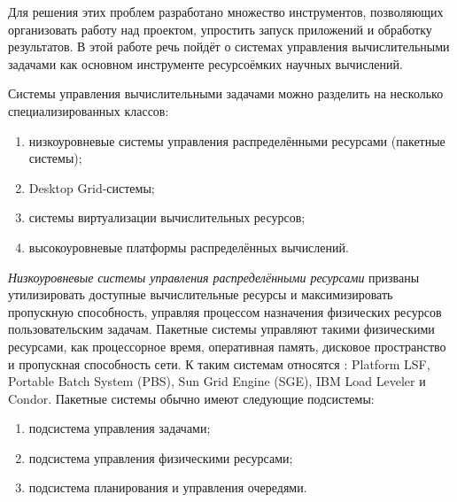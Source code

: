 Для решения этих проблем разработано множество инструментов, позволяющих организовать работу над проектом, упростить запуск приложений и обработку результатов. В этой работе речь пойдёт о системах управления вычислительными задачами как основном инструменте ресурсоёмких научных вычислений.



\smallskip




Системы управления вычислительными задачами можно разделить на несколько специализированных классов:

\begin{enumerate}

\item низкоуровневые системы управления распределёнными ресурсами (пакетные системы);

\item Desktop Grid-системы;

\item системы виртуализации вычислительных ресурсов;

\item высокоуровневые платформы распределённых вычислений.

\end{enumerate}



\smallskip \textit{Низкоуровневые системы управления распределёнными ресурсами} призваны утилизировать доступные вычислительные ресурсы и максимизировать пропускную способность, управляя процессом назначения физических ресурсов пользовательским задачам. Пакетные системы управляют такими физическими ресурсами, как процессорное время, оперативная память, дисковое пространство и пропускная способность сети. К таким системам относятся \cite{Yan2008Comparative}: Platform LSF, Portable Batch System (PBS), Sun Grid Engine (SGE), IBM Load Leveler и Condor. Пакетные системы обычно имеют следующие подсистемы:

\begin{enumerate}

\item подсистема управления задачами;

\item подсистема управления физическими ресурсами;

\item подсистема планирования и управления очередями.

\end{enumerate}


